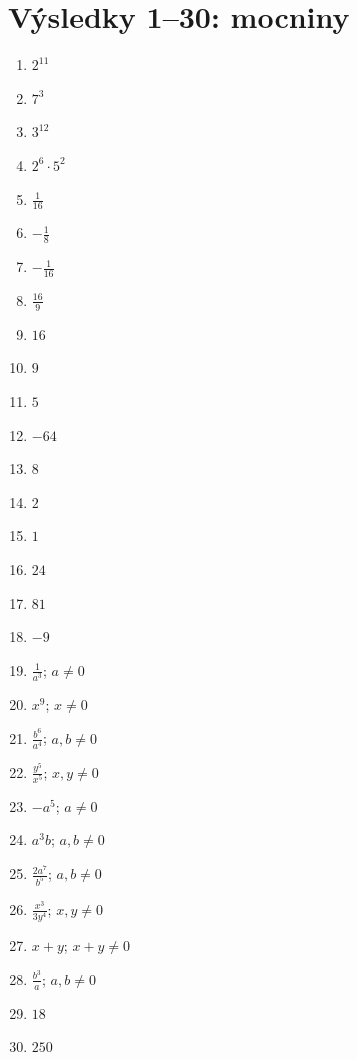 \documentclass[11pt,a4paper]{article}
\begin{document}
\section*{Výsledky 1--30: mocniny}
\begin{enumerate}[label=\textbf{\arabic*.},leftmargin=9mm,itemsep=4pt,start=1]
\small
\item $2^{11}$
\item $7^3$
\item $3^{12}$
\item $2^6\cdot5^2$
\item $\tfrac1{16}$
\item $-\tfrac18$
\item $-\tfrac1{16}$
\item $\tfrac{16}{9}$
\item $16$
\item $9$
\item $5$
\item $-64$
\item $8$
\item $2$
\item $1$
\item $24$
\item $81$
\item $-9$
\item $\tfrac1{a^3}$; $a\ne0$
\item $x^9$; $x\ne0$
\item $\tfrac{b^6}{a^4}$; $a,b\ne0$
\item $\tfrac{y^5}{x^5}$; $x,y\ne0$
\item $-a^5$; $a\ne0$
\item $a^3b$; $a,b\ne0$
\item $\tfrac{2a^7}{b^5}$; $a,b\ne0$
\item $\tfrac{x^3}{3y^4}$; $x,y\ne0$
\item $x+y$; $x+y\ne0$
\item $\tfrac{b^3}{a}$; $a,b\ne0$
\item $18$
\item $250$
\end{enumerate}
\end{document}
